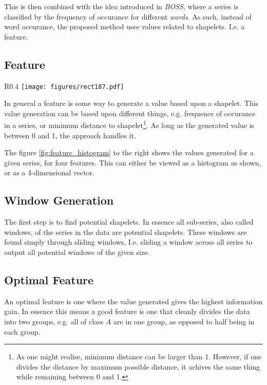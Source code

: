\documentclass[10pt]{article}
\begin{document}
This is then combined with the idea introduced in \textit{BOSS}\cite{BOSS}, where a series is classified by the frequency of occurance for different \textit{words}. As such, instead of word occurance, the proposed method uses values related to shapelets. I.e. a feature.
\newline

\newpage
\subsection{Feature}
\begin{wrapfigure}{R}{0.4\textwidth}
    {\texttt{[image: figures/rect187.pdf]}}
    \caption{Example of a feature histogram with 4 features}
    \vspace{-30pt}
    \label{fig:feature_histogram}
\end{wrapfigure}
\enlargethispage{2\baselineskip}
In general a feature is some way to generate a value based upon a shapelet. This value generation can be based upon different things, e.g. frequence of occurance in a series, or minimum distance to shapelet\footnote{As one might realise, minimum distance can be larger than 1. However, if one divides the distance by maximum possible distance, it achives the same thing while remaining between 0 and 1.}. As long as the generated value is between 0 and 1, the approach handles it.

The figure \ref{fig:feature_histogram} to the right shows the values generated for a given series, for four features. This can either be viewed as a histogram as shown, or as a 4-dimensional vector.

\subsection{Window Generation}
The first step is to find potential shapelets. In essence all sub-series, also called windows, of the series in the data are potential shapelets. These windows are found simply through sliding windows, I.e. sliding a window across all series to output all potential windows of the given size.

\subsection{Optimal Feature}
An optimal feature is one where the value generated gives the highest information gain. In essence this means a good feature is one that cleanly divides the data into two groups, e.g. all of class $A$ are in one group, as opposed to half being in each group. 
\end{document}
